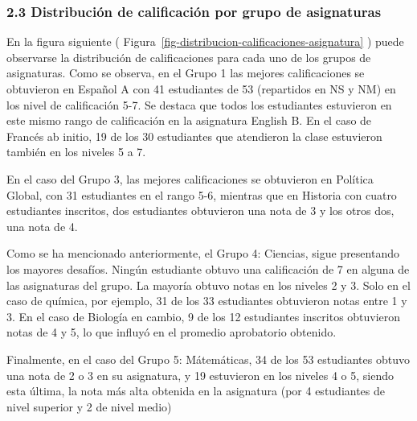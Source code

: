 \documentclass[
  letterpaper,
  DIV=11,
  numbers=noendperiod]{scrartcl}
\begin{document}
\hypertarget{distribuciuxf3n-de-calificaciuxf3n-por-grupo-de-asignaturas}{%
\subsubsection{2.3 Distribución de calificación por grupo de
asignaturas}\label{distribuciuxf3n-de-calificaciuxf3n-por-grupo-de-asignaturas}}

En la figura siguiente (
Figura~\ref{fig-distribucion-calificaciones-asignatura} ) puede
observarse la distribución de calificaciones para cada uno de los grupos
de asignaturas. Como se observa, en el Grupo 1 las mejores
calificaciones se obtuvieron en Español A con 41 estudiantes de 53
(repartidos en NS y NM) en los nivel de calificación 5-7. Se destaca que
todos los estudiantes estuvieron en este mismo rango de calificación en
la asignatura English B. En el caso de Francés ab initio, 19 de los 30
estudiantes que atendieron la clase estuvieron también en los niveles 5
a 7.

En el caso del Grupo 3, las mejores calificaciones se obtuvieron en
Política Global, con 31 estudiantes en el rango 5-6, mientras que en
Historia con cuatro estudiantes inscritos, dos estudiantes obtuvieron
una nota de 3 y los otros dos, una nota de 4.

Como se ha mencionado anteriormente, el Grupo 4: Ciencias, sigue
presentando los mayores desafíos. Ningún estudiante obtuvo una
calificación de 7 en alguna de las asignaturas del grupo. La mayoría
obtuvo notas en los niveles 2 y 3. Solo en el caso de química, por
ejemplo, 31 de los 33 estudiantes obtuvieron notas entre 1 y 3. En el
caso de Biología en cambio, 9 de los 12 estudiantes inscritos obtuvieron
notas de 4 y 5, lo que influyó en el promedio aprobatorio obtenido.

Finalmente, en el caso del Grupo 5: Mátemáticas, 34 de los 53
estudiantes obtuvo una nota de 2 o 3 en su asignatura, y 19 estuvieron
en los niveles 4 o 5, siendo esta última, la nota más alta obtenida en
la asignatura (por 4 estudiantes de nivel superior y 2 de nivel medio)
\end{document}
